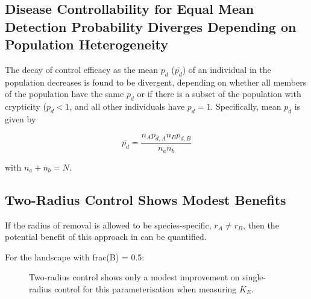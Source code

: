 \documentclass[prstpaper]{revtex4-2}
\begin{document}
\subsection{Disease Controllability for Equal Mean Detection Probability Diverges Depending on Population Heterogeneity}

The decay of control efficacy as the mean ${p_d}$ ($\bar{p_{d}}$) of an individual in the population decreases is  found to be divergent, depending on whether all members of the population have the same $p_d$  or if there is a subset of the population with crypticity ($p_{d} <1$, and all other individuals have $p_d = 1$. Specifically, mean $p_d$ is given by

\begin{equation}
\bar{p_{d}} = \frac{n_{A} p_{d,A}  n_{B} p_{d,B}}{n_{a} n_{b}} 
\end{equation}

with $n_{a} + n_{b} = N$. 





\subsection{Two-Radius Control Shows Modest Benefits}

If the radius of removal is allowed to be species-specific, $r_{A} \neq r_{B}$, then the potential benefit of this approach in can be quantified. 

For the landscape with frac(B) = 0.5:

\begin{figure}[hbt!]

\caption{ \label{tworadiii} Two-radius control shows only a modest improvement on single-radius control for this parameterisation when measuring $K_E$.}
\end{figure}

\end{document}
